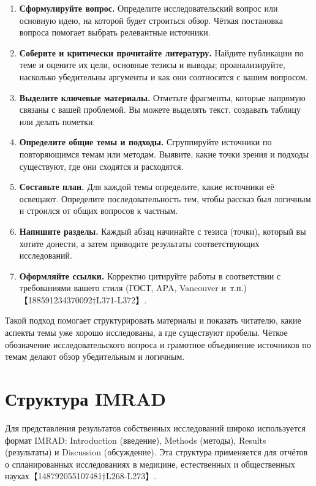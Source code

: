 \documentclass[
  russian,
  12pt,
  a4paper,
]{article}
\providecommand{\tightlist}{%
  \setlength{\itemsep}{0pt}\setlength{\parskip}{0pt}}
\begin{document}
\begin{enumerate}
\def\labelenumi{\arabic{enumi}.}
\tightlist
\item
  \textbf{Сформулируйте вопрос.} Определите исследовательский вопрос или
  основную идею, на которой будет строиться обзор. Чёткая постановка
  вопроса помогает выбрать релевантные источники.
\item
  \textbf{Соберите и критически прочитайте литературу.} Найдите
  публикации по теме и оцените их цели, основные тезисы и выводы;
  проанализируйте, насколько убедительны аргументы и как они соотносятся
  с вашим вопросом.
\item
  \textbf{Выделите ключевые материалы.} Отметьте фрагменты, которые
  напрямую связаны с вашей проблемой. Вы можете выделять текст,
  создавать таблицу или делать пометки.
\item
  \textbf{Определите общие темы и подходы.} Сгруппируйте источники по
  повторяющимся темам или методам. Выявите, какие точки зрения и подходы
  существуют, где они сходятся и расходятся.
\item
  \textbf{Составьте план.} Для каждой темы определите, какие источники
  её освещают. Определите последовательность тем, чтобы рассказ был
  логичным и строился от общих вопросов к частным.
\item
  \textbf{Напишите разделы.} Каждый абзац начинайте с тезиса (точки),
  который вы хотите донести, а затем приводите результаты
  соответствующих исследований.
\item
  \textbf{Оформляйте ссылки.} Корректно цитируйте работы в соответствии
  с требованиями вашего стиля (ГОСТ, APA, Vancouver
  и~т.п.)【188591234370092†L371-L372】.
\end{enumerate}

Такой подход помогает структурировать материалы и показать читателю,
какие аспекты темы уже хорошо исследованы, а где существуют пробелы.
Чёткое обозначение исследовательского вопроса и грамотное объединение
источников по темам делают обзор убедительным и логичным.

\chapter{Структура
IMRAD}\label{ux441ux442ux440ux443ux43aux442ux443ux440ux430-imrad}

Для представления результатов собственных исследований широко
используется формат IMRAD: Introduction (введение), Methods (методы),
Results (результаты) и Discussion (обсуждение). Эта структура
применяется для отчётов о спланированных исследованиях в медицине,
естественных и общественных науках【148792055107481†L268-L273】.
\end{document}
